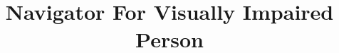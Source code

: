 \documentclass[conference]{IEEEtran}
\begin{document}


\title{Navigator For Visually Impaired Person\\
}
\end{document}
